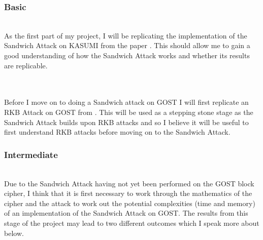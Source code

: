 \documentclass{article}
\begin{document}
\subsubsection{Basic}
 \\
As the first part of my project, I will be replicating the implementation of the Sandwich Attack on KASUMI from the paper \cite{C:DunKelSha10}. This should allow me to gain a good understanding of how the Sandwich Attack works and whether its results are replicable.\\\\
\\
Before I move on to doing a Sandwich attack on GOST I will first replicate an RKB Attack on GOST from \cite{DBLP:journals/iacr/Rudskoy10}. This will be used as a stepping stone stage as the Sandwich Attack builds upon RKB attacks and so I believe it will be useful to first understand RKB attacks before moving on to the Sandwich Attack.
\subsubsection{Intermediate}
\\
Due to the Sandwich Attack having not yet been performed on the GOST block cipher, I think that it is first necessary to work through the mathematics of the cipher and the attack to work out the potential complexities (time and memory) of an implementation of the Sandwich Attack on GOST. The results from this stage of the project may lead to two different outcomes which I speak more about below.
\end{document}
